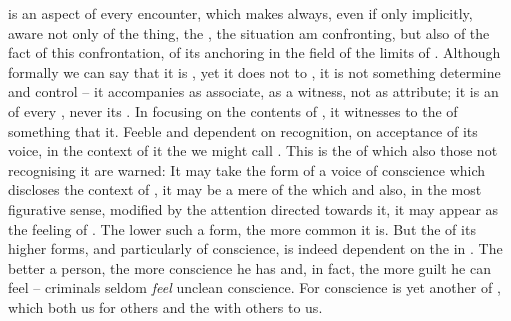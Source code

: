 \pa\label{selfomniscient}  is an aspect of every
 encounter, which makes  always, even if only implicitly,
aware not only of the thing, the , the situation  am
confronting, but also of the fact of this confrontation, of its
 anchoring in the field of  
the limits of .  Although formally we can say that it is 
, yet it does not  to , it is not
something  determine and control -- it accompanies  as 
associate, as a witness, not as  attribute; it is an  of every
, never its .  In  focusing on the
contents of , it witnesses to the  of something
that  it. Feeble and dependent on  recognition, on 
acceptance of its voice, in the context of  it  the 
we might call .
%
This is the  of which also those not recognising it are warned:
  It may take the form of a voice of conscience
which discloses the  context of , it may be a mere
 of the  which   and
also, in the most figurative sense, modified by the  attention
directed towards it, it may appear as the feeling of . The lower such a form, the more common it is. But the  of
its higher forms, and particularly of conscience, is indeed dependent on the
 in \yes. The better a person, the more conscience he
has and, in fact, the more guilt he can feel -- criminals seldom {\em feel}
unclean conscience. For conscience is yet another  of ,
which both  us for others and  the  with
others to us.

